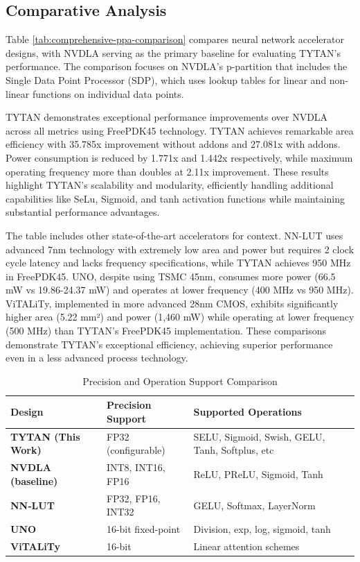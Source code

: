 \documentclass[runningheads]{llncs}
\begin{document}
\subsection{Comparative Analysis}
    Table \ref{tab:comprehensive-ppa-comparison} compares neural network accelerator designs, with NVDLA serving as the primary baseline for evaluating TYTAN's performance. The comparison focuses on NVDLA's p-partition that includes the Single Data Point Processor (SDP), which uses lookup tables for linear and non-linear functions on individual data points.

    TYTAN demonstrates exceptional performance improvements over NVDLA across all metrics using FreePDK45 technology. TYTAN achieves remarkable area efficiency with 35.785x improvement without addons and 27.081x with addons. Power consumption is reduced by 1.771x and 1.442x respectively, while maximum operating frequency more than doubles at 2.11x improvement. These results highlight TYTAN's scalability and modularity, efficiently handling additional capabilities like SeLu, Sigmoid, and tanh activation functions while maintaining substantial performance advantages.
    
    The table includes other state-of-the-art accelerators for context. NN-LUT uses advanced 7nm technology with extremely low area and power but requires 2 clock cycle latency and lacks frequency specifications, while TYTAN achieves 950 MHz in FreePDK45. UNO, despite using TSMC 45nm, consumes more power (66.5 mW vs 19.86-24.37 mW) and operates at lower frequency (400 MHz vs 950 MHz). ViTALiTy, implemented in more advanced 28nm CMOS, exhibits significantly higher area (5.22 mm²) and power (1,460 mW) while operating at lower frequency (500 MHz) than TYTAN's FreePDK45 implementation. These comparisons demonstrate TYTAN's exceptional efficiency, achieving superior performance even in a less advanced process technology.

    \begin{table}[t]
      \centering
      \caption{Precision and Operation Support Comparison}
      \label{tab:technical-specs}
      \begin{tabular}{lp{3.5cm}p{4.5cm}}
        \toprule
        \textbf{Design} & \textbf{Precision Support} & \textbf{Supported Operations} \\
        \midrule
        \textbf{TYTAN (This Work)} & 
          FP32 (configurable) &
          SELU, Sigmoid, Swish, GELU, Tanh, Softplus, etc \\
        \addlinespace
        \textbf{NVDLA (baseline)} & 
          INT8, INT16, FP16 &
          ReLU, PReLU, Sigmoid, Tanh \\
        \addlinespace
        \textbf{NN‑LUT~} & 
          FP32, FP16, INT32 &
          GELU, Softmax, LayerNorm \\
        \addlinespace
        \textbf{UNO~} & 
          16-bit fixed-point &
          Division, exp, log, sigmoid, tanh \\
        \addlinespace
        \textbf{ViTALiTy~} & 
          16-bit &
          Linear attention schemes \\
        \bottomrule
      \end{tabular}
    \end{table}
\end{document}
